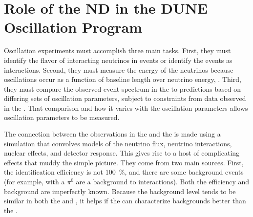 \section{Role of the ND in the DUNE Oscillation Program}
\label{sec:exsum-nd-role}

Oscillation experiments must accomplish three main tasks. First, they must identify the flavor of interacting neutrinos in  events or identify the events as  interactions. Second, they must measure the energy of the neutrinos because oscillations occur as a function of baseline length over neutrino energy, . Third, they must compare the observed event spectrum in the  to  predictions based on differing sets of oscillation parameters, subject to constraints from data observed in the .  That comparison and how it varies with the oscillation parameters allows oscillation parameters to be measured.

The connection between the observations in the  and the  is made using a simulation that convolves models of the neutrino flux, neutrino interactions, nuclear effects, and detector response.
This gives rise to a host of complicating effects that 
muddy the simple picture. They come from two main sources. First, the identification efficiency is not \SI{100}{\%}, and there are
some background events (for example,  with a $\pi^0$ are a background to \nue {} interactions). Both the efficiency and background are imperfectly known. %
Because the background level tends to be similar in both the  and , it helps if the  can characterize backgrounds better than the . %
%

